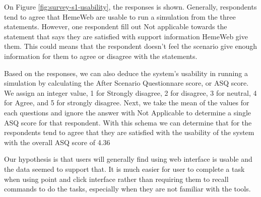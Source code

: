 \noindent%
\begin{minipage}{\linewidth}%
 \label{fig:survey-s1-usability}%
\end{minipage}
\vspace{0.5cm}


On Figure \ref{fig:survey-s1-usability}, the responses is shown. Generally, respondents tend to agree that HemeWeb are usable to run a simulation from the three statements. However, one respondent fill out Not applicable towards the statement that says they are satisfied with support information HemeWeb give them. This could means that the respondent doesn't feel the scenario give enough information for them to agree or disagree with the statements.

Based on the responses, we can also deduce the system's usability in running a simulation by calculating the After Scenario Questionnare score, or ASQ score. We assign an integer value, 1 for Strongly disagree, 2 for disagree, 3 for neutral, 4 for Agree, and 5 for strongly disagree. Next, we take the mean of the values for each questions and ignore the answer with Not Applicable to determine a single ASQ score for that respondent. With this schema we can determine that for the respondents tend to agree that they are satisfied with the usability of the system with the overall ASQ score of 4.36

Our hypothesis is that users will generally find using web interface is usable and the data seemed to support that. It is much easier for user to complete a task when using point and click interface rather than requiring them to recall commands to do the tasks, especially when they are not familiar with the tools.


